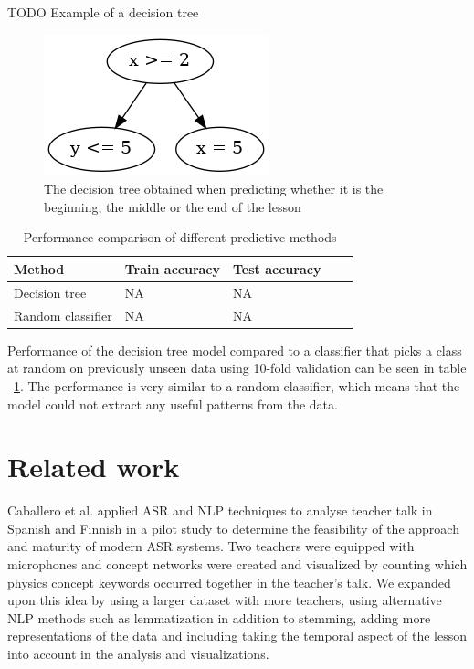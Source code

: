 \documentclass[utf8,english]{gradu3}
\begin{document}
TODO Example of a decision tree

\begin{figure}
  \includegraphics[width=\linewidth]{../figures/decisiontree.png}
  \caption{The decision tree obtained when predicting whether it is the beginning, the middle or the end of the lesson}
  \label{fig:decisiontree}
\end{figure}

\begin{table}[]
  \begin{tabular}{ | l | l | l | l | l |}
    \hline
    \textbf{Method} &  \textbf{Train accuracy} &  \textbf{Test accuracy}\\ \hline
      Decision tree & NA & NA \\
      Random classifier & NA & NA\\
    \hline
  \end{tabular}
  \caption{Performance comparison of different predictive methods}
  \label{table:predictperf}
\end{table}

Performance of the decision tree model compared to a classifier that picks a class at random on previously unseen data using 10-fold validation can be seen in table ~\ref{table:predictperf}. The performance is very similar to a random classifier, which means that the model could not extract any useful patterns from the data. 

\chapter{Related work}

Caballero et al. \parencite*{caballeroASRClassroomToday2017} applied ASR and NLP techniques to analyse teacher talk in Spanish and Finnish in a pilot study to determine the feasibility of the approach and maturity of modern ASR systems. Two teachers were equipped with microphones and concept networks were created and visualized by counting which physics concept keywords occurred together in the teacher's talk. We expanded upon this idea by using a larger dataset with more teachers, using alternative NLP methods such as lemmatization in addition to stemming, adding more representations of the data and including taking the temporal aspect of the lesson into account in the analysis and visualizations.
\end{document}
